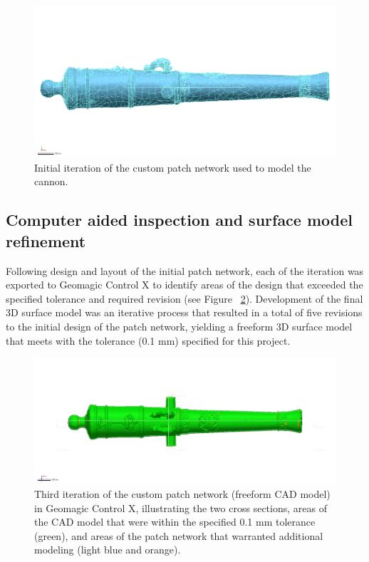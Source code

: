 \documentclass[review]{elsarticle}
\begin{document}
\begin{figure}[ht]\centering
\includegraphics[width=\linewidth]{FigLSC3}
\caption{Initial iteration of the custom patch network used to model the cannon.}
\label{fig:FigPatch}
\end{figure}

\subsection*{Computer aided inspection and surface model refinement}

Following design and layout of the initial patch network, each of the iteration was exported to Geomagic Control X to identify areas of the design that exceeded the specified tolerance and required revision (see Figure ~\ref{fig:Fig4}). Development of the final 3D surface model was an iterative process that resulted in a total of five revisions to the initial design of the patch network, yielding a freeform 3D surface model that meets with the tolerance (0.1 mm) specified for this project. 

\begin{figure}[ht]\centering
\includegraphics[width=\linewidth]{FigCanDev}
\caption{Third iteration of the custom patch network (freeform CAD model) in Geomagic Control X, illustrating the two cross sections, areas of the CAD model that were within the specified 0.1 mm tolerance (green), and areas of the patch network that warranted additional modeling (light blue and orange).}
\label{fig:Fig4}
\end{figure}
\end{document}
